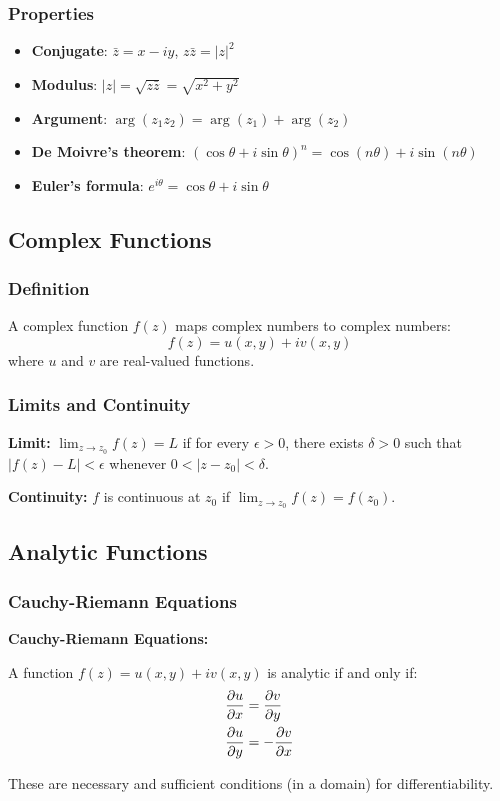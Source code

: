 \documentclass[12pt,a4paper]{article}
\begin{document}
\subsubsection{Properties}
\begin{itemize}
    \item \textbf{Conjugate}: $\bar{z} = x - iy$, $z\bar{z} = |z|^2$
    \item \textbf{Modulus}: $|z| = \sqrt{z\bar{z}} = \sqrt{x^2 + y^2}$
    \item \textbf{Argument}: $\arg(z_1 z_2) = \arg(z_1) + \arg(z_2)$
    \item \textbf{De Moivre's theorem}: $(\cos\theta + i\sin\theta)^n = \cos(n\theta) + i\sin(n\theta)$
    \item \textbf{Euler's formula}: $e^{i\theta} = \cos\theta + i\sin\theta$
\end{itemize}

\subsection{Complex Functions}
\subsubsection{Definition}
A complex function $f(z)$ maps complex numbers to complex numbers:
\begin{equation}
f(z) = u(x,y) + iv(x,y)
\end{equation}
where $u$ and $v$ are real-valued functions.

\subsubsection{Limits and Continuity}
\begin{formulabox}
\textbf{Limit:} $\lim_{z \to z_0} f(z) = L$ if for every $\epsilon > 0$, there exists $\delta > 0$ such that $|f(z) - L| < \epsilon$ whenever $0 < |z - z_0| < \delta$.

\textbf{Continuity:} $f$ is continuous at $z_0$ if $\lim_{z \to z_0} f(z) = f(z_0)$.
\end{formulabox}

\subsection{Analytic Functions}
\subsubsection{Cauchy-Riemann Equations}
\begin{importantbox}
\textbf{Cauchy-Riemann Equations:}

A function $f(z) = u(x,y) + iv(x,y)$ is analytic if and only if:
\begin{align}
\pdv{u}{x} &= \pdv{v}{y} \\
\pdv{u}{y} &= -\pdv{v}{x}
\end{align}

These are necessary and sufficient conditions (in a domain) for differentiability.
\end{importantbox}
\end{document}
